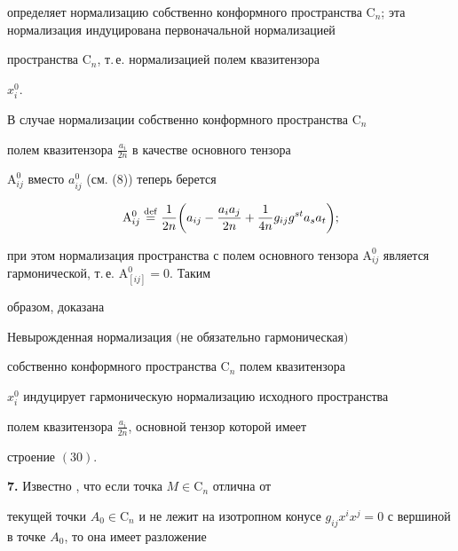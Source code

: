 определяет нормализацию собственно конформного пространства $\mathrm 


C_n$; эта нормализация индуцирована первоначальной нормализацией 


пространства $\mathrm C_n$, т.\,е. нормализацией полем квазитензора 


$x^0_i$. 


 


В случае нормализации собственно конформного пространства $\mathrm C_n$ 


полем квазитензора $\frac{a_i}{2n}$ в качестве основного тензора 


$\mathrm A^0_{i j}$ вместо $a^0_{i j}$ (см. (8)) теперь берется 


\begin{equation} 


\mathrm A^0_{i j}\defeq \frac{1}{2n}\bigg(a_{i j} 


-\frac{a_i a_j}{2n}+\frac{1}{4n}g_{i j}g^{s t}a_s a_t\bigg); 


\end{equation} 


при этом нормализация пространства с полем основного тензора $\mathrm 


A^0_{i j}$ является гармонической, т.\,е. $\mathrm A^0_{[i j]}=0$. Таким 


образом, доказана 


 


\begin{thm} 


Невырожденная нормализация $($не обязательно гармоническая$)$ 


собственно конформного пространства $\mathrm C_n$ полем квазитензора 


$x^0_i$ индуцирует гармоническую нормализацию исходного пространства 


полем квазитензора $\frac{a_i}{2n}$, основной тензор которой имеет 


строение $(30)$. 


\end{thm} 


 


{\bf 7.} Известно \cite{2}, что если точка $M\in\mathrm C_n$ отлична от 


текущей точки $A_0\in\mathrm C_n$ и не лежит на изотропном конусе $g_{i 


j}x^i x^j=0$ с вершиной в точке $A_0$, то она имеет разложение 


